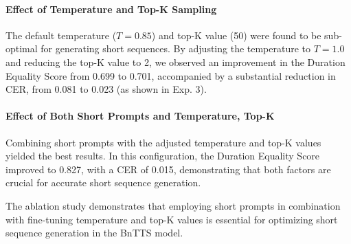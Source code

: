 \paragraph{Effect of Temperature and Top-K Sampling}
The default temperature (\(T = 0.85\)) and top-K value (50) were found to be sub-optimal for generating short sequences. By adjusting the temperature to \(T = 1.0\) and reducing the top-K value to 2, we observed an improvement in the Duration Equality Score from 0.699 to 0.701, accompanied by a substantial reduction in CER, from 0.081 to 0.023 (as shown in Exp. 3).

\paragraph{Effect of Both Short Prompts and Temperature, Top-K}
Combining short prompts with the adjusted temperature and top-K values yielded the best results. In this configuration, the Duration Equality Score improved to 0.827, with a CER of 0.015, demonstrating that both factors are crucial for accurate short sequence generation.

The ablation study demonstrates that employing short prompts in combination with fine-tuning temperature and top-K values is essential for optimizing short sequence generation in the BnTTS model.

